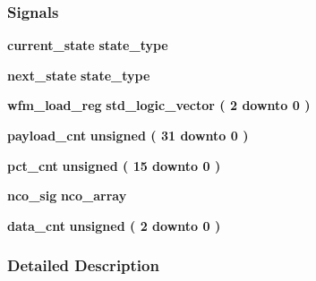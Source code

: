 \subsubsection*{Signals}
 \begin{DoxyCompactItemize}
\item 
{\bf current\+\_\+state} {\bfseries {\bfseries {\bf state\+\_\+type}} \textcolor{vhdlchar}{ }} 
\item 
{\bf next\+\_\+state} {\bfseries {\bfseries {\bf state\+\_\+type}} \textcolor{vhdlchar}{ }} 
\item 
{\bf wfm\+\_\+load\+\_\+reg} {\bfseries \textcolor{comment}{std\+\_\+logic\+\_\+vector}\textcolor{vhdlchar}{ }\textcolor{vhdlchar}{(}\textcolor{vhdlchar}{ }\textcolor{vhdlchar}{ } \textcolor{vhdldigit}{2} \textcolor{vhdlchar}{ }\textcolor{keywordflow}{downto}\textcolor{vhdlchar}{ }\textcolor{vhdlchar}{ } \textcolor{vhdldigit}{0} \textcolor{vhdlchar}{ }\textcolor{vhdlchar}{)}\textcolor{vhdlchar}{ }} 
\item 
{\bf payload\+\_\+cnt} {\bfseries \textcolor{comment}{unsigned}\textcolor{vhdlchar}{ }\textcolor{vhdlchar}{(}\textcolor{vhdlchar}{ }\textcolor{vhdlchar}{ } \textcolor{vhdldigit}{31} \textcolor{vhdlchar}{ }\textcolor{keywordflow}{downto}\textcolor{vhdlchar}{ }\textcolor{vhdlchar}{ } \textcolor{vhdldigit}{0} \textcolor{vhdlchar}{ }\textcolor{vhdlchar}{)}\textcolor{vhdlchar}{ }} 
\item 
{\bf pct\+\_\+cnt} {\bfseries \textcolor{comment}{unsigned}\textcolor{vhdlchar}{ }\textcolor{vhdlchar}{(}\textcolor{vhdlchar}{ }\textcolor{vhdlchar}{ } \textcolor{vhdldigit}{15} \textcolor{vhdlchar}{ }\textcolor{keywordflow}{downto}\textcolor{vhdlchar}{ }\textcolor{vhdlchar}{ } \textcolor{vhdldigit}{0} \textcolor{vhdlchar}{ }\textcolor{vhdlchar}{)}\textcolor{vhdlchar}{ }} 
\item 
{\bf nco\+\_\+sig} {\bfseries {\bfseries {\bf nco\+\_\+array}} \textcolor{vhdlchar}{ }} 
\item 
{\bf data\+\_\+cnt} {\bfseries \textcolor{comment}{unsigned}\textcolor{vhdlchar}{ }\textcolor{vhdlchar}{(}\textcolor{vhdlchar}{ }\textcolor{vhdlchar}{ } \textcolor{vhdldigit}{2} \textcolor{vhdlchar}{ }\textcolor{keywordflow}{downto}\textcolor{vhdlchar}{ }\textcolor{vhdlchar}{ } \textcolor{vhdldigit}{0} \textcolor{vhdlchar}{ }\textcolor{vhdlchar}{)}\textcolor{vhdlchar}{ }} 
\end{DoxyCompactItemize}


\subsubsection{Detailed Description}


